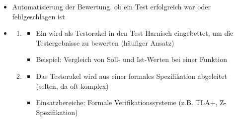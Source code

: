\begin{infoBox}[title=Generierung des Testergebnisses (Test Verdict)]
    \begin{itemize}
        \item {} Automatisierung der Bewertung, ob ein Test erfolgreich war oder fehlgeschlagen ist
        \item {}
        \begin{enumerate}
            \item {}
            \begin{itemize}
                \item Ein  wird als Testorakel in den Test-Harnisch eingebettet, um die Testergebnisse zu bewerten (häufiger Ansatz)
                \item Beispiel: Vergleich von Soll- und Ist-Werten bei einer Funktion
            \end{itemize}
            \item {}
            \begin{itemize}
                \item Das Testorakel wird aus einer formales Spezifikation abgeleitet (selten, da oft komplex)
                \item Einsatzbereiche: Formale Verifikationssysteme (z.B. TLA+, Z-Spezifikation)
            \end{itemize}
        \end{enumerate}
    \end{itemize}
\end{infoBox}

